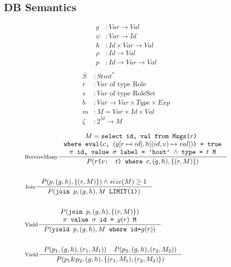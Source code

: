 \documentclass[acmsmall,review,anonymous]{acmart}\settopmatter{printfolios=true,printccs=false,printacmref=false}
\begin{document}
\subsection{DB Semantics}
\begin{align*}
  g &\colon Var \to Val \\
  \psi &\colon Var \to Id \\
  h &\colon Id \times Var \to Val \\
  \rho &\colon Id \to Val \\
  p &\colon Id \to Var \to Val \\
\end{align*}
\begin{align*}
  \overline{S} &\colon Stmt^\ast \\
  r &\colon Var \text{ of type Role} \\
  s &\colon Var \text{ of type RoleSet} \\
  b &\colon Var \to Var \times Type \times Exp \\
  m &\colon M = Var \times Id \times Val \\
  \zeta &\colon 2^M \to M
\end{align*}

\begin{align*}
  &\inference[ReceiveMany]{
    M = \texttt{select id, val from Msgs($r$) }\\
    \texttt{where eval($c$, $(g[r \mapsto id], h[(id, v) \mapsto val])$) = true} \\
    \texttt{$\pi$ id, value $\sigma$ label = 'host' $\land$ type = $t$ M}
  }{
    P(\texttt{$r$($v$: $t$) where $c$}, (g, h), \{ (r, M) \})
  }\\ \\
  &\inference[Join]{
    P(p, (g, h), \{ (r, M) \}) \land size(M) \geq 1
  }{
    P(\texttt{join }p, (g, h), M\texttt{ LIMIT(1)})
  }\\ \\
  &\inference[Yield]{
    P(\texttt{join }p, (g, h), \{ (r, M) \}) \\
    \texttt{$\pi$ value $\sigma$ id = $g(r)$ M}
  }{
    P(\texttt{yield }p, (g, h), M\texttt{ where id=$g(r)$})
  }\\ \\
  &\inference[Yield]{
    P(p_1, (g, h), (r_1, M_1)) \;\;\;\; P(p_2, (g, h), (r_2, M_2))
  }{
    P(p_1 \& p_2, (g, h), \{ (r_1, M_1), (r_2, M_2) \})
  }
\end{align*}


\vfill
\pagebreak
\end{document}
